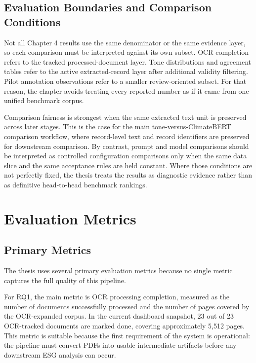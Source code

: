 \documentclass[english, online, cse, master]{dithesis}
\begin{document}
\subsection{Evaluation Boundaries and Comparison Conditions}

Not all Chapter 4 results use the same denominator or the same evidence layer, so each comparison must be interpreted against its own subset. OCR completion refers to the tracked processed-document layer. Tone distributions and agreement tables refer to the active extracted-record layer after additional validity filtering. Pilot annotation observations refer to a smaller review-oriented subset. For that reason, the chapter avoids treating every reported number as if it came from one unified benchmark corpus.

Comparison fairness is strongest when the same extracted text unit is preserved across later stages. This is the case for the main tone-versus-ClimateBERT comparison workflow, where record-level text and record identifiers are preserved for downstream comparison. By contrast, prompt and model comparisons should be interpreted as controlled configuration comparisons only when the same data slice and the same acceptance rules are held constant. Where those conditions are not perfectly fixed, the thesis treats the results as diagnostic evidence rather than as definitive head-to-head benchmark rankings.

\section{Evaluation Metrics}

\subsection{Primary Metrics}

The thesis uses several primary evaluation metrics because no single metric captures the full quality of this pipeline.

For RQ1, the main metric is OCR processing completion, measured as the number of documents successfully processed and the number of pages covered by the OCR-expanded corpus. In the current dashboard snapshot, 23 out of 23 OCR-tracked documents are marked done, covering approximately 5,512 pages. This metric is suitable because the first requirement of the system is operational: the pipeline must convert PDFs into usable intermediate artifacts before any downstream ESG analysis can occur.
\end{document}
